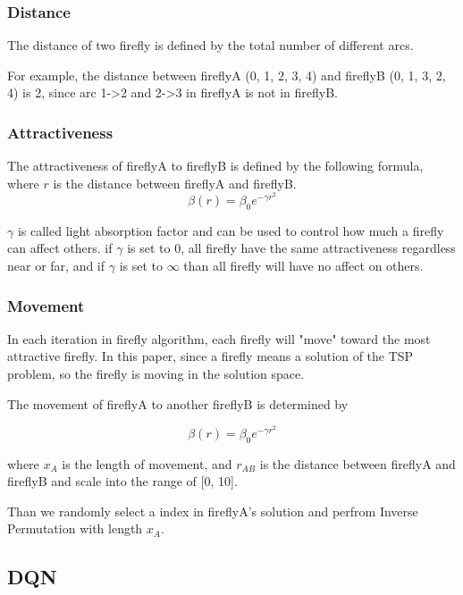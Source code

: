 \documentclass[twocolumn, a4paper]{extarticle}
\begin{document}
\subsubsection{Distance}
The distance of two firefly is defined by the total number of different arcs. 

For example, the distance between fireflyA (0, 1, 2, 3, 4) and fireflyB (0, 1, 3, 2, 4) is 2, since arc 1->2 and 2->3 in fireflyA is not in fireflyB.

\subsubsection{Attractiveness}
The attractiveness of fireflyA to fireflyB is defined by the following formula, where $r$ is the distance between fireflyA and fireflyB.
\begin{equation}
	\beta(r)=\beta_0e^{-\gamma r^2}
\end{equation}


$\gamma$ is called light absorption factor and can be used to control how much a firefly can affect others. if $\gamma$ is set to 0, all firefly have the same attractiveness regardless near or far, and if $\gamma$ is set to $\infty$ than all firefly will have no affect on others.

\subsubsection{Movement}
In each iteration in firefly algorithm, each firefly will "move" toward the most attractive firefly.
In this paper, since a firefly means a solution of the TSP problem, so the firefly is moving in the solution space. 

The movement of fireflyA to another fireflyB is determined by

\begin{equation}
	\beta(r)=\beta_0e^{-\gamma r^2}
\end{equation}

where $x_A$ is the length of movement, and $r_{AB}$ is the distance between fireflyA and fireflyB and scale into the range of [0, 10].

Than we randomly select a index in fireflyA's solution and perfrom Inverse Permutation with length $x_A$.

\subsection{DQN}
\end{document}
